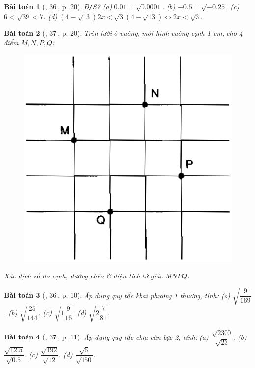 \documentclass{article}
\newtheorem{baitoan}{Bài toán}
\begin{document}
\begin{baitoan}[\cite{SGK_Toan_9_tap_1}, 36., p. 20]
	\emph{Đ\texttt{/}S?} (a) $0.01 = \sqrt{0.0001}$. (b) $-0.5 = \sqrt{-0.25}$. (c) $6 < \sqrt{39} < 7$. (d) $(4 - \sqrt{13})2x < \sqrt{3}(4 - \sqrt{13})\Leftrightarrow2x < \sqrt{3}$.
\end{baitoan}

\begin{baitoan}[\cite{SGK_Toan_9_tap_1}, 37., p. 20]
	Trên lưới ô vuông, mỗi hình vuông cạnh \emph{1 cm}, cho 4 điểm $M,N,P,Q$:
	\begin{figure}[H]
		\centering
		\includegraphics[scale=0.2]{SGK_3_p20}
	\end{figure}
	\noindent Xác định số đo cạnh, đường chéo \& diện tích tứ giác $MNPQ$.
\end{baitoan}

\begin{baitoan}[\cite{SBT_Toan_9_tap_1}, 36., p. 10]
	Áp dụng quy tắc khai phương 1 thương, tính: (a) $\sqrt{\dfrac{9}{169}}$. (b) $\sqrt{\dfrac{25}{144}}$. (c) $\sqrt{1\dfrac{9}{16}}$. (d) $\sqrt{2\dfrac{7}{81}}$.
\end{baitoan}

\begin{baitoan}[\cite{SBT_Toan_9_tap_1}, 37., p. 11]
	Áp dụng quy tắc chia căn bậc 2, tính: (a) $\dfrac{\sqrt{2300}}{\sqrt{23}}$. (b) $\dfrac{\sqrt{12.5}}{\sqrt{0.5}}$. (c) $\dfrac{\sqrt{192}}{\sqrt{12}}$. (d) $\dfrac{\sqrt{6}}{\sqrt{150}}$.
\end{baitoan}
\end{document}
